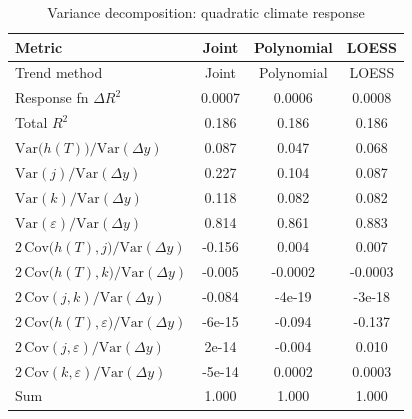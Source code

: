 \begin{table}[htbp]
\centering
\caption{Variance decomposition: quadratic climate response}
\label{tab:variance_decomp_quadratic}

\small
\begin{tabular}{@{}lccc@{}}
\toprule
Metric & Joint & Polynomial & LOESS \\
\midrule
Trend method & Joint & Polynomial & LOESS \\
\midrule
Response fn $\Delta R^2$ & 0.0007 & 0.0006 & 0.0008 \\
Total $R^2$ & 0.186 & 0.186 & 0.186 \\
\midrule
$\mathrm{Var}\!\big(h(T)\big)/\mathrm{Var}(\Delta y)$ & 0.087 & 0.047 & 0.068 \\
$\mathrm{Var}(j)/\mathrm{Var}(\Delta y)$ & 0.227 & 0.104 & 0.087 \\
$\mathrm{Var}(k)/\mathrm{Var}(\Delta y)$ & 0.118 & 0.082 & 0.082 \\
$\mathrm{Var}(\varepsilon)/\mathrm{Var}(\Delta y)$ & 0.814 & 0.861 & 0.883 \\
\midrule
$2\,\mathrm{Cov}\!\big(h(T),j\big)/\mathrm{Var}(\Delta y)$ & -0.156 & 0.004 & 0.007 \\
$2\,\mathrm{Cov}\!\big(h(T),k\big)/\mathrm{Var}(\Delta y)$ & -0.005 & -0.0002 & -0.0003 \\
$2\,\mathrm{Cov}(j,k)/\mathrm{Var}(\Delta y)$ & -0.084 & -4e-19 & -3e-18 \\
$2\,\mathrm{Cov}\!\big(h(T),\varepsilon\big)/\mathrm{Var}(\Delta y)$ & -6e-15 & -0.094 & -0.137 \\
$2\,\mathrm{Cov}(j,\varepsilon)/\mathrm{Var}(\Delta y)$ & 2e-14 & -0.004 & 0.010 \\
$2\,\mathrm{Cov}(k,\varepsilon)/\mathrm{Var}(\Delta y)$ & -5e-14 & 0.0002 & 0.0003 \\
\midrule
Sum & 1.000 & 1.000 & 1.000 \\
\bottomrule
\end{tabular}
\end{table}